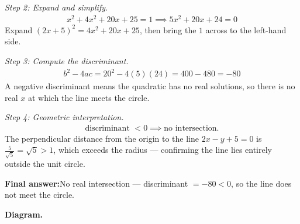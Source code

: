 \documentclass[11pt]{article}
\begin{document}
\textit{Step 2: Expand and simplify.}
\[\begin{gathered}
x^2 + 4x^2 + 20x + 25 = 1 \implies 5x^2 + 20x + 24 = 0
\end{gathered}\]
Expand \( (2x+5)^2 = 4x^2 + 20x + 25 \), then bring the \( 1 \) across to the left-hand side.

\textit{Step 3: Compute the discriminant.}
\[\begin{gathered}
b^2 - 4ac = 20^2 - 4(5)(24) = 400 - 480 = -80
\end{gathered}\]
A negative discriminant means the quadratic has no real solutions, so there is no real \( x \) at which the line meets the circle.

\textit{Step 4: Geometric interpretation.}
\[\begin{gathered}
\text{discriminant } < 0 \implies \text{no intersection.}
\end{gathered}\]
The perpendicular distance from the origin to the line \( 2x - y + 5 = 0 \) is \( \tfrac{5}{\sqrt{5}} = \sqrt{5} > 1 \), which exceeds the radius --- confirming the line lies entirely outside the unit circle.

\begin{answerbox}
\textbf{Final answer:}\quad No real intersection --- discriminant \(\displaystyle = -80 < 0\), so the line does not meet the circle.
\end{answerbox}
\textbf{Diagram.}
\end{document}
